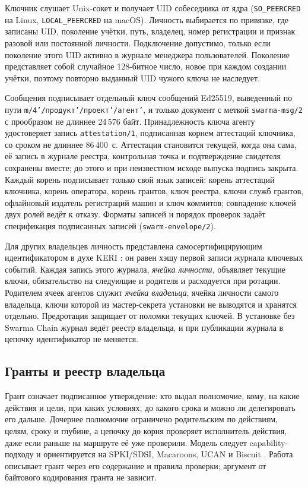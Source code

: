 \documentclass[10pt,a4paper]{article}
\begin{document}
Ключник слушает Unix-сокет и получает UID собеседника от ядра (\texttt{SO\_PEERCRED} на Linux, \texttt{LOCAL\_PEERCRED} на macOS). Личность выбирается по привязке, где записаны UID, поколение учётки, путь, владелец, номер регистрации и признак разовой или постоянной личности. Подключение допустимо, только если поколение этого UID активно в журнале менеджера пользователей. Поколение представляет собой случайное 128-битное число, новое при каждом создании учётки, поэтому повторно выданный UID чужого ключа не наследует.

Сообщения подписывает отдельный ключ сообщений Ed25519, выведенный по пути \texttt{m/4'/продукт'/\allowbreak проект'/\allowbreak агент'}, и только документ с меткой \texttt{swarma-msg/2} с прообразом не длиннее 24\,576 байт. Принадлежность ключа агенту удостоверяет запись \texttt{attestation/1}, подписанная корнем аттестаций ключника, со сроком не длиннее 86\,400~с. Аттестация становится текущей, когда она сама, её запись в журнале реестра, контрольная точка и подтверждение свидетеля сохранены вместе; до этого и при неизвестном исходе выпуска подпись закрыта. Каждый корень подписывает только свой язык записей: корень аттестаций ключника, корень оператора, корень грантов, ключ реестра, ключи служб грантов, офлайновый издатель регистраций машин и ключ коммитов; совпадение ключей двух ролей ведёт к отказу. Форматы записей и порядок проверок задаёт спецификация подписанных записей (\texttt{swarm-envelope/2}).

Для других владельцев личность представлена самосертифицирующим идентификатором в духе KERI \cite{keri}: он равен хэшу первой записи журнала ключевых событий. Каждая запись этого журнала, \emph{ячейка личности}, объявляет текущие ключи, обязательство на следующие и родителя и расходуется при ротации. Родителем ячеек агентов служит \emph{ячейка владельца}, ячейка личности самого владельца, ключи которой из мастер-секрета установки не выводятся и хранятся отдельно. Предротация защищает от поломки текущих ключей. В установке без Swarma Chain журнал ведёт реестр владельца, и при публикации журнала в цепочку идентификатор не меняется.

\subsection{Гранты и реестр владельца}
\label{sec:grants}

Грант означает подписанное утверждение: кто выдал полномочие, кому, на какие действия и цели, при каких условиях, до какого срока и можно ли делегировать его дальше. Дочернее полномочие ограничено родительским по действиям, целям, сроку и глубине, а цепочку до корня проверяет исполнитель действия, даже если раньше на маршруте её уже проверили. Модель следует capability-подходу \cite{dennis1966,miller2006} и ориентируется на SPKI/SDSI, Macaroons, UCAN и Biscuit \cite{spki,macaroons,ucan,biscuit}. Работа описывает грант через его содержание и правила проверки; аргумент от байтового кодирования гранта не зависит.
\end{document}
